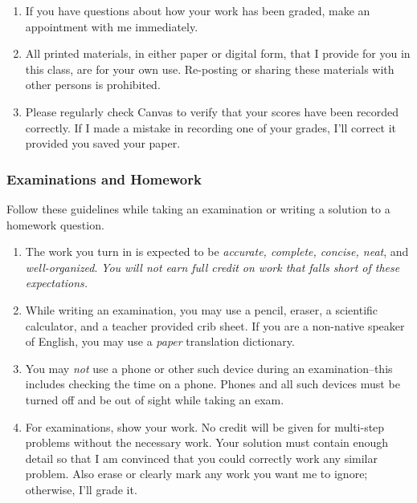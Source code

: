 \documentclass[12pt,fullpage]{article}
\newcounter{ex}\setcounter{ex}{0}
\begin{document}
\begin{enumerate}
\item If you have questions about how your work has been graded, make an appointment with me immediately.

\item All printed materials, in either paper or digital form, that I provide for you in this class, are for your own use. Re-posting or sharing these materials with other persons is prohibited. 

\item Please regularly check Canvas  to verify that your scores have been recorded correctly.  If I made a mistake in recording one of
your grades, I'll correct it provided you saved your paper.

\end{enumerate}

\subsubsection*{Examinations and Homework}

Follow these guidelines while taking an examination or writing a solution to a homework question.

\begin{enumerate}

\item The work you turn in is expected to be \emph{accurate, complete, concise, neat}, and \emph{well-organized}.  \emph{You will not earn
full credit on work that falls short of these expectations.}




\item While writing an examination, you may use a pencil, eraser, a scientific calculator, and a teacher provided crib sheet. If you are a non-native speaker of English,
you may use a \emph{paper} translation dictionary.  

\item  You may \emph{not} use a phone or other such device during an examination--this includes checking the time on a phone. Phones and all such devices must be turned off and be out of sight while taking an exam. 



\item For examinations, show your work.  No credit will be given for multi-step problems without the necessary work. Your solution must contain enough detail
so that I am convinced that you could correctly work any similar problem. Also erase or clearly mark any work you want me to ignore; otherwise,
I'll grade it.  

\end{enumerate}
\end{document}

